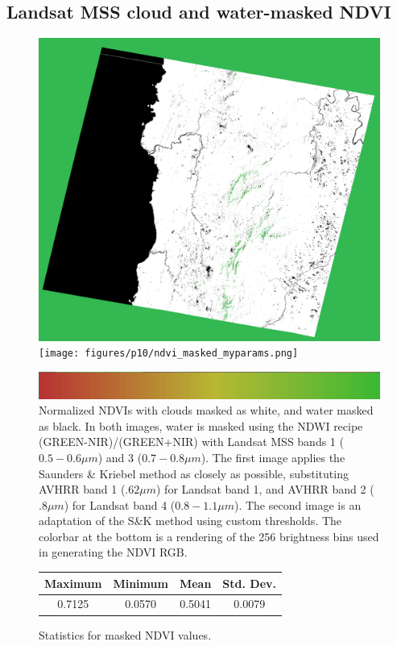 \documentclass[12pt]{article}
\begin{document}
\subsection{Landsat MSS cloud and water-masked NDVI}

\begin{figure}[h!]
    \centering
    \includegraphics[width=.48\linewidth]{figures/p10/ndvi_masked_skparams.png}
    \texttt{[image: figures/p10/ndvi\_masked\_myparams.png]}

    \vspace{.2em}
    \includegraphics[width=.48\linewidth]{figures/p10/cbar.png}
    \caption{Normalized NDVIs with clouds masked as white, and water masked as black. In both images, water is masked using the NDWI recipe (GREEN-NIR)/(GREEN+NIR) with Landsat MSS bands 1 ($0.5-0.6\mu m$) and 3 ($0.7-0.8\mu m$). The first image applies the Saunders \& Kriebel method as closely as possible, substituting AVHRR band 1 ($.62\mu m$) for Landsat band 1, and AVHRR band 2 ($.8\mu m$) for Landsat band 4 ($0.8-1.1\mu m$). The second image is an adaptation of the S\&K method using custom thresholds. The colorbar at the bottom is a rendering of the 256 brightness bins used in generating the NDVI RGB.}
    \label{p9_landsat}
\end{figure}

\begin{figure}[h!]
    \centering
    \begin{tabular}{ c c c c }
        Maximum & Minimum & Mean & Std. Dev. \\
        \hline
        0.7125 & 0.0570 & 0.5041 & 0.0079 \\
    \end{tabular}
    \caption{Statistics for masked NDVI values.}
    \label{p9_stats}
\end{figure}
\end{document}
